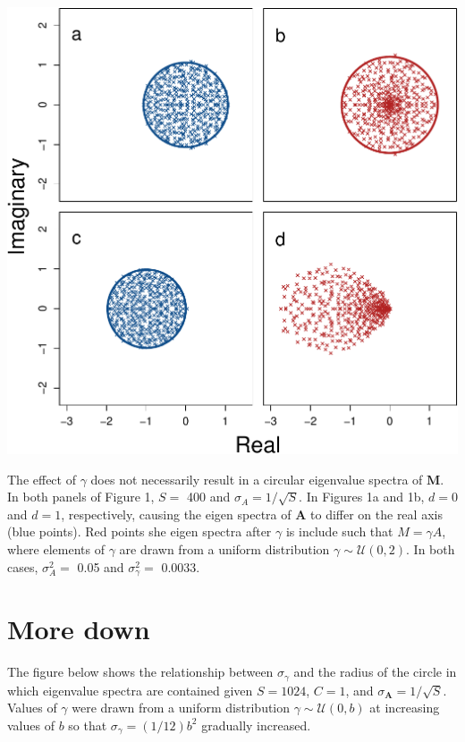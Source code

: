 \documentclass[]{article}
\begin{document}
\includegraphics{revision_notes_files/figure-latex/unnamed-chunk-2-1.pdf}

The effect of \(\gamma\) does not necessarily result in a circular
eigenvalue spectra of \(\textbf{M}\). In both panels of Figure 1,
\(S =\) 400 and \(\sigma_{A} = 1/\sqrt{S}\). In Figures 1a and 1b,
\(d = 0\) and \(d = 1\), respectively, causing the eigen spectra of
\(\textbf{A}\) to differ on the real axis (blue points). Red points she
eigen spectra after \(\gamma\) is include such that \(M = \gamma A\),
where elements of \(\gamma\) are drawn from a uniform distribution
\(\gamma \sim \mathcal{U}(0, 2)\). In both cases, \(\sigma^{2}_{A} =\)
0.05 and \(\sigma^{2}_{\gamma} =\) 0.0033.

\section{More down}\label{more-down}

The figure below shows the relationship between \(\sigma_{\gamma}\) and
the radius of the circle in which eigenvalue spectra are contained given
\(S = 1024\), \(C = 1\), and \(\sigma_{\textbf{A}} = 1/\sqrt{S}\).
Values of \(\gamma\) were drawn from a uniform distribution
\(\gamma \sim \mathcal{U}(0, b)\) at increasing values of \(b\) so that
\(\sigma_{\gamma} = (1/12)b^2\) gradually increased.
\end{document}
